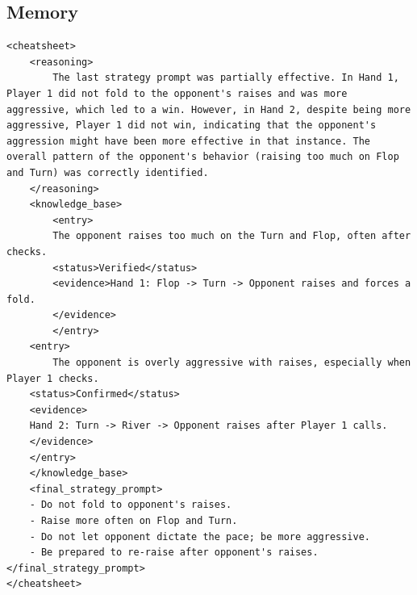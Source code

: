\documentclass{article}
\theoremstyle{plain}
\theoremstyle{definition}
\theoremstyle{remark}
\begin{document}
\begin{tcolorbox}[breakable]
\subsection*{Memory }
\vspace{-5pt}
\begin{lstlisting}[basicstyle=\scriptsize\ttfamily, breaklines=true]
<cheatsheet> 
    <reasoning> 
        The last strategy prompt was partially effective. In Hand 1, Player 1 did not fold to the opponent's raises and was more aggressive, which led to a win. However, in Hand 2, despite being more aggressive, Player 1 did not win, indicating that the opponent's aggression might have been more effective in that instance. The overall pattern of the opponent's behavior (raising too much on Flop and Turn) was correctly identified. 
    </reasoning> 
    <knowledge_base> 
        <entry> 
        The opponent raises too much on the Turn and Flop, often after checks. 
        <status>Verified</status> 
        <evidence>Hand 1: Flop -> Turn -> Opponent raises and forces a fold.
        </evidence> 
        </entry> 
    <entry> 
        The opponent is overly aggressive with raises, especially when Player 1 checks. 
    <status>Confirmed</status> 
    <evidence>
    Hand 2: Turn -> River -> Opponent raises after Player 1 calls.
    </evidence> 
    </entry> 
    </knowledge_base> 
    <final_strategy_prompt> 
    - Do not fold to opponent's raises. 
    - Raise more often on Flop and Turn. 
    - Do not let opponent dictate the pace; be more aggressive. 
    - Be prepared to re-raise after opponent's raises. </final_strategy_prompt> 
</cheatsheet>
\end{lstlisting}
\end{tcolorbox}
\end{document}
